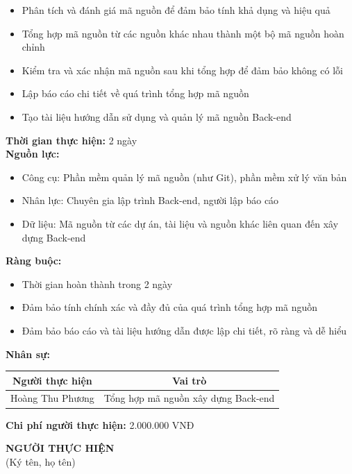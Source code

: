 {\begin{minipage}{\textwidth}
    \begin{itemize}
        \item Phân tích và đánh giá mã nguồn để đảm bảo tính khả dụng và hiệu quả
        \item Tổng hợp mã nguồn từ các nguồn khác nhau thành một bộ mã nguồn hoàn chỉnh
        \item Kiểm tra và xác nhận mã nguồn sau khi tổng hợp để đảm bảo không có lỗi
        \item Lập báo cáo chi tiết về quá trình tổng hợp mã nguồn
        \item Tạo tài liệu hướng dẫn sử dụng và quản lý mã nguồn Back-end
    \end{itemize}
    \vspace{0.5cm}
    \noindent \textbf{Thời gian thực hiện:} 2 ngày \\
    \noindent \textbf{Nguồn lực:}
    \begin{itemize}
        \item Công cụ: Phần mềm quản lý mã nguồn (như Git), phần mềm xử lý văn bản
        \item Nhân lực: Chuyên gia lập trình Back-end, người lập báo cáo
        \item Dữ liệu: Mã nguồn từ các dự án, tài liệu và nguồn khác liên quan đến xây dựng Back-end
    \end{itemize}
    \vspace{0.5cm}
    \noindent \textbf{Ràng buộc:}
    \begin{itemize}
        \item Thời gian hoàn thành trong 2 ngày
        \item Đảm bảo tính chính xác và đầy đủ của quá trình tổng hợp mã nguồn
        \item Đảm bảo báo cáo và tài liệu hướng dẫn được lập chi tiết, rõ ràng và dễ hiểu
    \end{itemize}
    \vspace{0.5cm}
    \noindent \textbf{Nhân sự:}
    \begin{longtable}{|c|c|}
    \hline
    \textbf{Người thực hiện} & \textbf{Vai trò} \\
    \hline
    Hoàng Thu Phương & Tổng hợp mã nguồn xây dựng Back-end \\
    \hline
    \end{longtable}
    \vspace{0.5cm}
    \noindent \textbf{Chi phí người thực hiện:} 2.000.000 VNĐ \\
    \vspace{1cm}
    \begin{flushleft}
        \hspace{8cm} \textbf{NGƯỜI THỰC HIỆN} \\
        \hspace{8.8cm} (Ký tên, họ tên) \\
        \vspace{1cm}
    \end{flushleft}
    \end{minipage}
}
% 
